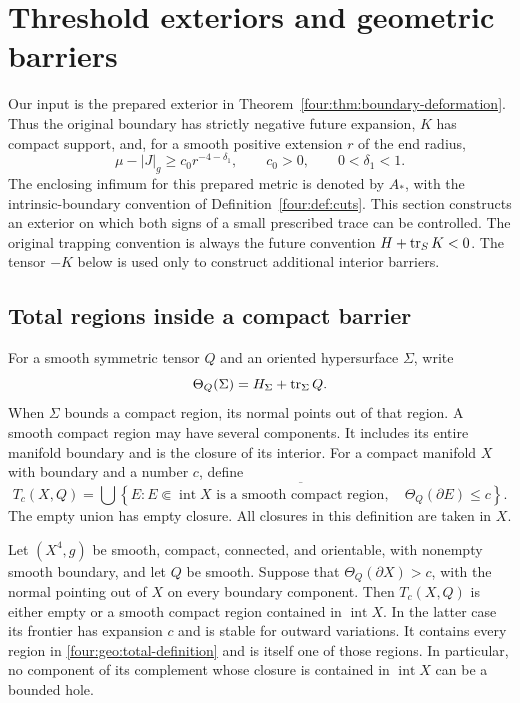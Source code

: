 \section{Threshold exteriors and geometric barriers}\label{four:sec:geometry}

Our input is the prepared exterior in
Theorem~\ref{four:thm:boundary-deformation}.  Thus the original boundary has strictly
negative future expansion, $K$ has compact support, and, for a smooth positive
extension $r$ of the end radius,
\begin{equation}\label{four:geo:prepared-gap}
 \mu-|J|_g\ge c_0r^{-4-\delta_1},\qquad c_0>0,\qquad 0<\delta_1<1.
\end{equation}
The enclosing infimum for this prepared metric is denoted by $A_*$, with the
intrinsic-boundary convention of Definition~\ref{four:def:cuts}.  This section
constructs an exterior on which both signs of a small prescribed trace can be
controlled.  The original trapping convention is always the future convention
$H+\operatorname{tr}_S K<0$.  The tensor $-K$ below is used only to construct additional
interior barriers.

\subsection{Total regions inside a compact barrier}

For a smooth symmetric tensor $Q$ and an oriented hypersurface $\Sigma$, write
\[
 \Theta_Q(\Sigma)=H_\Sigma+\operatorname{tr}_\Sigma Q.
\]
When $\Sigma$ bounds a compact region, its normal points out of that region.
A smooth compact region may have several components.  It includes its entire
manifold boundary and is the closure of its interior.  For a compact manifold
$X$ with boundary and a number $c$, define
\begin{equation}\label{four:geo:total-definition}
 T_c(X,Q)=\overline{\bigcup\left\{E:
 E\Subset\operatorname{int}X\text{ is a smooth compact region},\quad
 \Theta_Q(\partial E)\le c\right\}}.
\end{equation}
The empty union has empty closure.  All closures in this definition are taken
in $X$.

\begin{lemma}\label{four:geo:compact-total}
Let $(X^4,g)$ be smooth, compact, connected, and orientable, with nonempty
smooth boundary, and let $Q$ be smooth.  Suppose that
$\Theta_Q(\partial X)>c$, with the normal pointing out of $X$ on every
boundary component.  Then $T_c(X,Q)$ is either empty or a smooth compact
region contained in $\operatorname{int}X$.  In the latter case its frontier
has expansion $c$ and is stable for outward variations.  It contains every
region in \eqref{four:geo:total-definition} and is itself one of those regions.
In particular, no component of its complement whose closure is contained in
$\operatorname{int}X$ can be a bounded hole.
\end{lemma}

